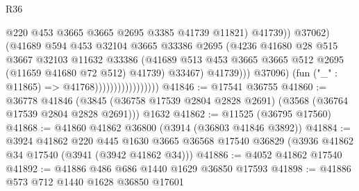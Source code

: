 \begin{lexlean}{R36}
\begin{coremodule}
                                                  @220
                                                  @453
                                                  @3665
                                                  @3665
                                                  @2695
                                                  @3385
                                                  @41739
                                                  @11821)
                                                @41739))
                                            @37062)
                                          (@41689
                                            @594
                                            @453
                                            @32104
                                            @3665
                                            @33386
                                            @2695
                                            (@4236
                                              @41680
                                              @28
                                              @515
                                              @3667
                                              @32103
                                              @11632
                                              @33386
                                              (@41689
                                                @513
                                                @453
                                                @3665
                                                @3665
                                                @512
                                                @2695
                                                (@11659 @41680 @72 @512)
                                                @41739)
                                              @33467)
                                            @41739)))
                                      @37096)
                                    (fun ("_" : @11865) => @41768)))))))))))))))))
@41846 := @17541 @36755
@41860 := @36778
    @41846
    (@3845 (@36758 @17539 @2804 @2828 @2691) (@3568 (@36764 @17539 @2804 @2828 @2691)))
    @1632
@41862 := @11525 (@36795 @17560)
@41868 := @41860 @41862 @36800 (@3914 (@36803 @41846 @3892))
@41884 := @3924
    @41862
    @220
    @445
    @1630
    @3665
    @36568
    @17540
    @36829
    (@3936 @41862 @34 @17540 (@3941 (@3942 @41862 @34)))
@41886 := @4052 @41862 @17540
@41892 := @41886 @486 @686 @1440 @1629 @36850 @17593
@41898 := @41886 @573 @712 @1440 @1628 @36850 @17601

\end{coremodule}
\end{lexlean}
